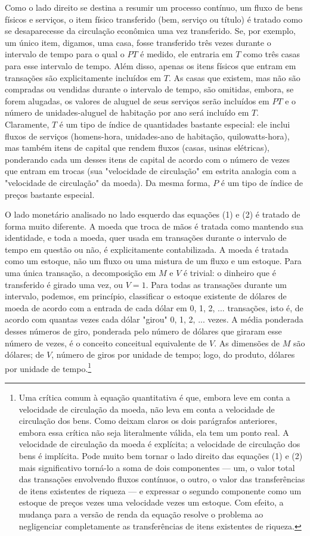 \documentclass[12pt]{article}
\begin{document}
Como o lado direito se destina a resumir um processo contínuo, um fluxo de bens físicos e serviços, o item físico transferido (bem, serviço ou título) é tratado como se desaparecesse da circulação econômica uma vez transferido. Se, por exemplo, um único item, digamos, uma casa, fosse transferido três vezes durante o intervalo de tempo para o qual o $PT$ é medido, ele entraria em $T$ como três casas para esse intervalo de tempo. Além disso, apenas os itens físicos que entram em transações são explicitamente incluídos em $T$. As casas que existem, mas não são compradas ou vendidas durante o intervalo de tempo, são omitidas, embora, se forem alugadas, os valores de aluguel de seus serviços serão incluídos em $PT$ e o número de unidades-aluguel de habitação por ano será incluído em $T$. Claramente, $T$ é um tipo de índice de quantidades bastante especial: ele inclui fluxos de serviços (homens-hora, unidades-ano de habitação, quilowatts-hora), mas também itens de capital que rendem fluxos (casas, usinas elétricas), ponderando cada um desses itens de capital de acordo com o número de vezes que entram em trocas (sua "velocidade de circulação" em estrita analogia com a "velocidade de circulação" da moeda). Da mesma forma, $P$ é um tipo de índice de preços bastante especial.

O lado monetário analisado no lado esquerdo das equações (1) e (2) é tratado de forma muito diferente. A moeda que troca de mãos é tratada como mantendo sua identidade, e toda a moeda, quer usada em transações durante o intervalo de tempo em questão ou não, é explicitamente contabilizada. A moeda é tratada como um estoque, não um fluxo ou uma mistura de um fluxo e um estoque. Para uma única transação, a decomposição em $M$ e $V$ é trivial: o dinheiro que é transferido é girado uma vez, ou $V = 1$. Para todas as transações durante um intervalo, podemos, em princípio, classificar o estoque existente de dólares de moeda de acordo com a entrada de cada dólar em 0, 1, 2, ... transações, isto é, de acordo com quantas vezes cada dólar "girou" 0, 1, 2, ... vezes. A média ponderada desses números de giro, ponderada pelo número de dólares que giraram esse número de vezes, é o conceito conceitual equivalente de $V$. As dimensões de $M$ são dólares; de $V$, número de giros por unidade de tempo; logo, do produto, dólares por unidade de tempo.\footnote{Uma crítica comum à equação quantitativa é que, embora leve em conta a velocidade de circulação da moeda, não leva em conta a velocidade de circulação dos bens. Como deixam claros os dois parágrafos anteriores, embora essa crítica não seja literalmente válida, ela tem um ponto real. A velocidade de circulação da moeda é explícita; a velocidade de circulação dos bens é implícita. Pode muito bem tornar o lado direito das equações (1) e (2) mais significativo torná-lo a soma de dois componentes — um, o valor total das transações envolvendo fluxos contínuos, o outro, o valor das transferências de itens existentes de riqueza — e expressar o segundo componente como um estoque de preços vezes uma velocidade vezes um estoque. Com efeito, a mudança para a versão de renda da equação resolve o problema ao negligenciar completamente as transferências de itens existentes de riqueza.}
\end{document}
